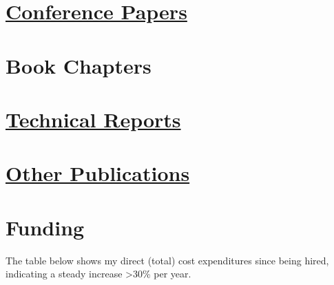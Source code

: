 \documentclass[10pt,colorlinks=true,urlcolor=blue]{moderncv}
\begin{document}
\section{\href{https://neurodata.io/publications/\#conf}{Conference Papers}}
\begin{refsection}
    \nocite{*}
    \printbibliography[%
        title=\href{https://neurodata.io/publications/\#conf}{Peer-Reviewed Conference Proceedings},%
        heading=none%
        ]
    \end{refsection}

\section{Book Chapters}
\begin{refsection}
    \nocite{*}
    \printbibliography[%
        title={Book Chapters},%
        heading=none%
        ]
    \end{refsection}


\section{\href{https://neurodata.io/research/\#pre_prints}{Technical Reports}}
\begin{refsection} %
\nocite{*}
\printbibliography[%
    title=\href{https://neurodata.io/publications/\#pre_prints}{Technical Reports},%
    heading=none%
    ]
\end{refsection}

\section{\href{https://neurodata.io/research/\#other}{Other Publications}}
\begin{refsection} %
    \nocite{*}
    \printbibliography[%
        title=\href{https://neurodata.io/publications/\#other}{Other Publications},%
        heading=none%
        ]
    \end{refsection}
    


    \section{Funding}
    The table below shows my direct (total) cost expenditures since being hired, indicating a steady increase >30\% per year.\newline \newline
    
\end{document}
